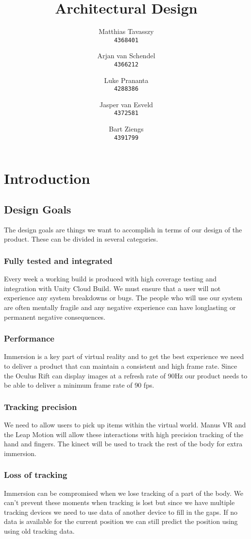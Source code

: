 \documentclass[11pt,a4paper]{report}
\title{Architectural Design }
\author{
Matthias Tavasszy \\
\texttt{4368401}	
\and
Arjan van Schendel \\
\texttt{4366212}
\and
Luke Prananta \\ 
\texttt{4288386}  
\and
Jasper van Esveld \\
\texttt{4372581}
\and
Bart Ziengs \\ 
\texttt{4391799}
}
\begin{document}
\maketitle


\tableofcontents
\chapter*{Introduction}
\section*{Design Goals}
The design goals are things we want to accomplish in terms of our design of the product.
These can be divided in several categories.
\subsection*{Fully tested and integrated}
Every week a working build is produced with high coverage testing and integration with
Unity Cloud Build. We must ensure that a user will not experience any system breakdowns or
bugs. The people who will use our system are often mentally fragile and any negative
experience can have long­lasting or permanent negative consequences.
\subsection*{Performance}
Immersion is a key part of virtual reality and to get the best experience we need to deliver a
product that can maintain a consistent and high frame rate. Since the Oculus Rift can display
images at a refresh rate of 90Hz our product needs to be able to deliver a minimum frame rate
of 90 fps.
\subsection*{Tracking precision}
We need to allow users to pick up items within the virtual world. Manus VR and the Leap
Motion will allow these interactions with high precision tracking of the hand and fingers. The
kinect will be used to track the rest of the body for extra immersion.
\subsection*{Loss of tracking}
Immersion can be compromised when we lose tracking of a part of the body. We can’t
prevent these moments when tracking is lost but since we have multiple tracking devices we
need to use data of another device to fill in the gaps. If no data is available for the current
position we can still predict the position using using old tracking data.
\end{document}
